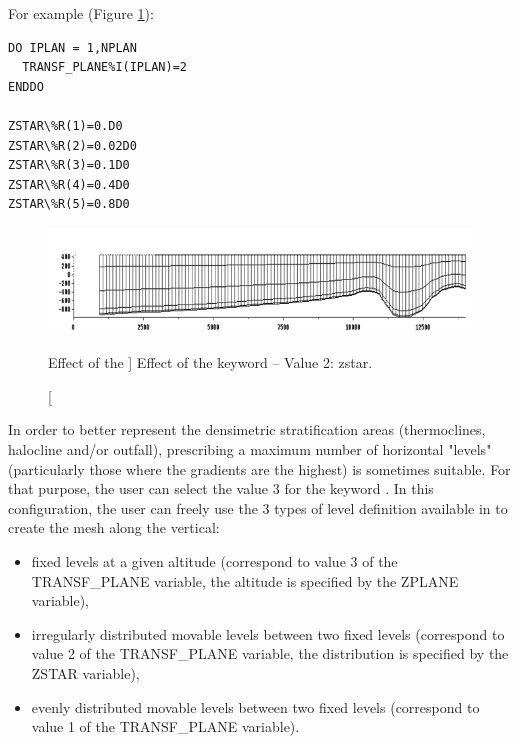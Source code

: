 For example (Figure \ref{fig:mesh_transf2}):

\begin{lstlisting}[language=TelFortran]
DO IPLAN = 1,NPLAN
  TRANSF_PLANE%I(IPLAN)=2
ENDDO

ZSTAR\%R(1)=0.D0
ZSTAR\%R(2)=0.02D0
ZSTAR\%R(3)=0.1D0
ZSTAR\%R(4)=0.4D0
ZSTAR\%R(5)=0.8D0

\end{lstlisting}

\begin{figure}[H]%
\begin{center}
%
  \includegraphics[width=\textwidth]{./graphics/mesh_transformation2}
%
\end{center}
\caption
[Effect of the ]
{Effect of the  keyword -- Value 2: zstar.}
\label{fig:mesh_transf2}
\end{figure}

In order to better represent the densimetric stratification areas
(thermoclines, halocline and/or outfall), prescribing a maximum number of
horizontal "levels" (particularly those where the gradients are the highest) is
sometimes suitable. For that purpose, the user can select the value 3 for the
keyword . In this configuration, the user can
freely use the 3 types of level definition available in  to create
the mesh along the vertical:

\begin{itemize}
\item fixed levels at a given altitude (correspond to value 3 of the
TRANSF\_PLANE variable, the altitude is specified by the ZPLANE variable),

\item irregularly distributed movable levels between two fixed levels
(correspond to value 2 of the TRANSF\_PLANE variable, the distribution is
specified by the ZSTAR variable),

\item evenly distributed movable levels between two fixed levels (correspond
to value 1 of the TRANSF\_PLANE variable).
\end{itemize}

